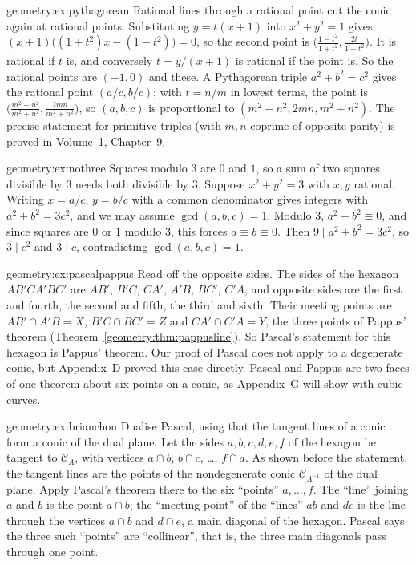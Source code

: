 \begin{solution}{geometry:ex:pythagorean}
\idea Rational lines through a rational point cut the conic again at rational points.
\writeup Substituting $y=t(x+1)$ into $x^2+y^2=1$ gives $(x+1)\bigl((1+t^2)x-(1-t^2)\bigr)=0$, so the second point is
$\bigl(\frac{1-t^2}{1+t^2},\frac{2t}{1+t^2}\bigr)$. It is rational if $t$ is, and conversely $t=y/(x+1)$ is rational if the point is. So the rational points
are $(-1,0)$ and these. A Pythagorean triple $a^2+b^2=c^2$ gives the rational point $(a/c,b/c)$; with $t=n/m$ in lowest terms, the point is
$\bigl(\frac{m^2-n^2}{m^2+n^2},\frac{2mn}{m^2+n^2}\bigr)$, so $(a,b,c)$ is proportional to $(m^2-n^2,2mn,m^2+n^2)$. The precise statement for primitive
triples (with $m,n$ coprime of opposite parity) is proved in Volume~1, Chapter~9.
\end{solution}

\begin{solution}{geometry:ex:nothree}
\idea Squares modulo $3$ are $0$ and $1$, so a sum of two squares divisible by $3$ needs both divisible by $3$.
\writeup Suppose $x^2+y^2=3$ with $x,y$ rational. Writing $x=a/c$, $y=b/c$ with a common denominator gives integers with $a^2+b^2=3c^2$, and we may assume
$\gcd(a,b,c)=1$. Modulo $3$, $a^2+b^2\equiv0$, and since squares are $0$ or $1$ modulo $3$, this forces $a\equiv b\equiv0$. Then $9\mid a^2+b^2=3c^2$,
so $3\mid c^2$ and $3\mid c$, contradicting $\gcd(a,b,c)=1$.
\end{solution}

\begin{solution}{geometry:ex:pascalpappus}
\idea Read off the opposite sides.
\writeup The sides of the hexagon $AB'CA'BC'$ are $AB'$, $B'C$, $CA'$, $A'B$, $BC'$, $C'A$, and opposite sides are the first and fourth, the second and fifth,
the third and sixth. Their meeting points are $AB'\cap A'B=X$, $B'C\cap BC'=Z$ and $CA'\cap C'A=Y$, the three points of Pappus' theorem (Theorem~\ref{geometry:thm:pappusline}).
So Pascal's statement for this hexagon is Pappus' theorem. Our proof of Pascal does not apply to a degenerate conic, but Appendix~D proved this case
directly. Pascal and Pappus are two faces of one theorem about six points on a conic, as Appendix~G will show with cubic curves.
\end{solution}

\begin{solution}{geometry:ex:brianchon}
\idea Dualise Pascal, using that the tangent lines of a conic form a conic of the dual plane.
\writeup Let the sides $a,b,c,d,e,f$ of the hexagon be tangent to $\mathcal C_A$, with vertices $a\cap b$, $b\cap c$, \dots, $f\cap a$. As shown before the
statement, the tangent lines are the points of the nondegenerate conic $\mathcal C_{A^{-1}}$ of the dual plane. Apply Pascal's theorem there to the
six ``points'' $a,\dots,f$. The ``line'' joining $a$ and $b$ is the point $a\cap b$; the ``meeting point'' of the ``lines'' $ab$ and $de$ is the line
through the vertices $a\cap b$ and $d\cap e$, a main diagonal of the hexagon. Pascal says the three such ``points'' are ``collinear'', that is, the
three main diagonals pass through one point.
\end{solution}

